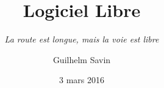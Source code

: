 \title{Logiciel Libre}
\subtitle{\emph{\og La route est longue, mais la voie est libre\fg{}}}
\author{Guilhelm Savin}
\date{3 mars 2016}
